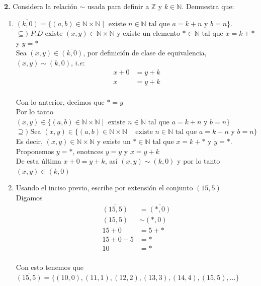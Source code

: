 \documentclass[12pt]{article}
\begin{document}
%
%
\textbf{2.} Considera la relación $\sim$ usada para definir a $\mathbb{Z}$ y $k \in \mathbb{N}$. Demuestra que:
    \begin{enumerate}[label=\alph*)]
        \item $\overline{(k, 0)} = \{(a, b) \in \mathbb{N} \times \mathbb{N} \mid \text{ existe } n \in \mathbb{N} \text{ tal que } a = k + n \text{ y } b = n\}$.\\

        $\subseteq)$ 
        $P.D$ existe $(x, y) \in \mathbb{N} \times \mathbb{N}$ y existe un elemento $\ast \in \mathbb{N}$ tal que $x = k + \ast$ y $y =\ast $\\

        Sea $(x, y) \in \overline{(k, 0)}$, por definición de clase de equivalencia, $(x, y) \sim (k, 0)$, $i.e$:
        \begin{align*}
            x + 0 &= y + k\\
            x &= y + k\\
        \end{align*}

        Con lo anterior, decimos que $\ast = y$\\

        Por lo tanto $(x, y) \in \{(a, b) \in \mathbb{N} \times \mathbb{N} \mid \text{ existe } n \in \mathbb{N} \text{ tal que } a = k + n \text{ y } b = n\}$\\
        
        $\supseteq)$ Sea $(x, y) \in \{(a, b) \in \mathbb{N} \times \mathbb{N} \mid \text{ existe } n \in \mathbb{N} \text{ tal que } a = k + n \text{ y } b = n\}$\\

        Es decir, $(x, y) \in \mathbb{N} \times \mathbb{N}$ y existe un $\ast \in \mathbb{N}$ tal que $x = k + \ast$ y $y = \ast$.\\
        
        Proponemos $y = \ast$, enotnces $y = y$ y $x = y + k$\\

        De esta última $x + 0 = y + k$, así $(x, y) \sim (k, 0)$ y por lo tanto $(x, y) \in \overline{(k, 0)}$\\

        \item Usando el inciso previo, escribe por extensión el conjunto $\overline{(15, 5)}$\\

        Digamos 
        \begin{align*}
            \overline{(15, 5)} &= \overline{(\ast, 0)}\\
            (15, 5) &\sim (\ast, 0)\\
            15 + 0 &= 5 + \ast\\
            15 + 0 - 5 &= \ast\\
            10 &= \ast\\
        \end{align*}

        Con esto tenemos que $\overline{(15, 5)} = \{(10, 0), (11, 1), (12, 2), (13, 3), (14, 4), (15, 5), \dots\}$\\
    \end{enumerate}
\end{document}
